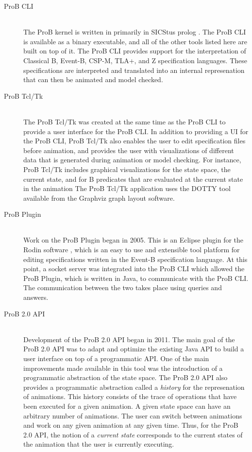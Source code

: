 \begin{description}

	\item[ProB CLI] \hfill \\ 
	The ProB kernel is written in primarily in SICStus prolog \cite{LeBu08_225}. The ProB CLI is available as a binary executable, and all of the other tools listed here are built on top of it. The ProB CLI provides support for the interpretation of Classical B, Event-B, CSP-M, TLA+, and Z specification languages. These specifications are interpreted and translated into an internal represenation that can then be animated and model checked.

	\item[ProB Tcl/Tk] \hfill \\
	The ProB Tcl/Tk was created at the same time as the ProB CLI to provide a user interface for the ProB CLI. In addition to providing a UI for the ProB CLI, ProB Tcl/Tk also enables the user to edit specification files before animation, and provides the user with visualizations of different data that is generated during animation or model checking. For instance, ProB Tcl/Tk includes graphical visualizations for the state space, the current state, and for B predicates that are evaluated at the current state in the animation \cite{LeSaBeLu08_228} The ProB Tcl/Tk application uses the DOTTY tool available from the Graphviz graph layout software.

	\item[ProB Plugin] \hfill \\
	Work on the ProB Plugin began in 2005. This is an Eclipse plugin for the Rodin software \cite{BuHa07_292}, which is an easy to use and extensible tool platform for editing specifications written in the Event-B specification language. At this point, a socket server was integrated into the ProB CLI which allowed the ProB Plugin, which is written in Java, to communicate with the ProB CLI. The communication between the two takes place using queries and answers.

	\item[ProB 2.0 API] \hfill \\
	Development of the ProB 2.0 API began in 2011. The main goal of the ProB 2.0 API was to adapt and optimize the existing Java API to build a user interface on top of a programmatic API. One of the main improvements made available in this tool was the introduction of a programmatic abstraction of the state space. The ProB 2.0 API also provides a programmatic abstraction called a \emph{history} for the represenation of animations. This history consists of the trace of operations that have been executed for a given animation. A given state space can have an arbitrary number of animations. The user can switch between animations and work on any given animation at any given time. Thus, for the ProB 2.0 API, the notion of a \emph{current state} corresponds to the current states of the animation that the user is currently executing.


\end{description}
